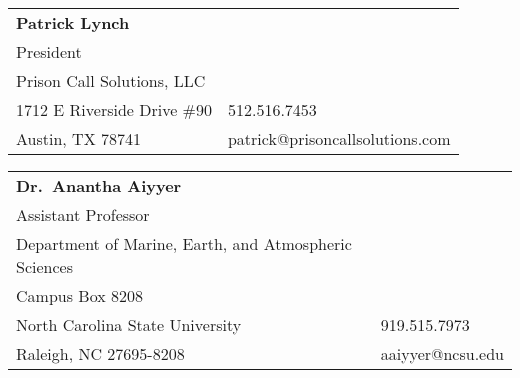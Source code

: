\documentclass[margin,line]{resume}
\begin{document}
\begin{resume}
\begin{tabular}{@{}p{9cm}p{3cm}}
\textbf{Patrick Lynch}\\
President\\
Prison Call Solutions, LLC\\
1712 E Riverside Drive \#90                   &  512.516.7453\\
Austin, TX 78741                      &  patrick@prisoncallsolutions.com\\
\end{tabular}

\begin{tabular}{@{}p{9cm}p{3cm}}
\textbf{Dr.\ Anantha Aiyyer}\\
Assistant Professor\\
Department of Marine, Earth, and Atmospheric Sciences\\
Campus Box 8208\\
North Carolina State University                   &  919.515.7973\\
Raleigh, NC  27695-8208                       &  aaiyyer@ncsu.edu\\
\end{tabular}





\end{resume}
\end{document}
